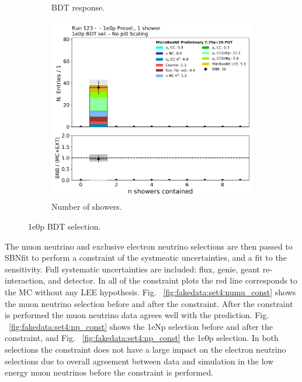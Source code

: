 \begin{figure}[H]
\begin{center}
\begin{subfigure}[b]{0.3\textwidth}
    \caption{\label{fig:fakedata:set4:zp_postsel_bdt} BDT response.}
    \end{subfigure}
    \begin{subfigure}[b]{0.3\textwidth}
    \centering
    \includegraphics[width=1.00\textwidth]{Fakedata/set4/zp_postsel_nshr.pdf}
    \caption{\label{fig:fakedata:set4:zp_postsel_nshr} Number of showers.}
    \end{subfigure}
\caption{\label{fig:fakedata:set4:zpsel} 1e0p BDT selection.}
\end{center}
\end{figure}


The muon neutrino and exclusive electron neutrino selections are then passed to SBNfit to perform a constraint of the systmeatic uncertainties, and a fit to the sensitivity.  Full systematic uncertainties are included: flux, genie, geant re-interaction, and detector.  In all of the constraint plots the red line corresponds to the MC without any LEE hypothesis. Fig. ~\ref{fig:fakedata:set4:numu_const} shows the muon neutrino selection before and after the constraint. After the constraint is performed the muon neutrino data agrees well with the prediction.   
Fig. ~\ref{fig:fakedata:set4:np_const} shows the 1eNp selection before and after the constraint, and Fig. ~\ref{fig:fakedata:set4:np_const} the 1e0p selection.  In both selections the constraint does not have a large impact on the electron neutrino selections due to overall agreement between data and simulation in the low energy muon neutrinos before the constraint is performed.

